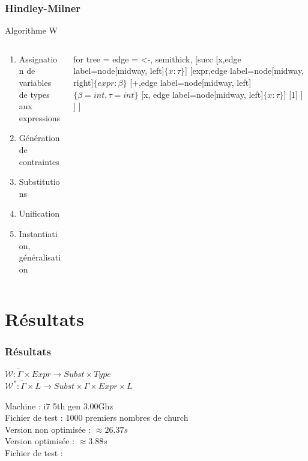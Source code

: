\documentclass{beamer}
\begin{document}
\begin{frame}
		\frametitle{Hindley-Milner}
		Algorithme W
		\begin{columns}
				\begin{column}{0.5\textwidth}
						\begin{enumerate}
								\item Assignation de variables de types aux expressions
								\item Génération de contraintes
								\item Substitutions
								\item Unification
								\item Instantiation, généralisation
						\end{enumerate}
				\end{column}
				\begin{column}{0.5\textwidth}
						\begin{forest}
								for tree = {
										edge = {<-, semithick},
								}
								[succ
								[x,edge label={node[midway, left]{$\{x:\tau\}$}}]
										[expr,edge label={node[midway, right]{$\{expr:\beta\}$}}
												[+,edge label={node[midway, left]{$\{\beta = int, \tau = int\}$}}
														[x, edge label={node[midway, left]{$\{x:\tau\}$}}]
														[1]	
												]
										]
								]
						\end{forest}
				\end{column}
		\end{columns}
\end{frame}

\section{Résultats}
\begin{frame}[t]
		\frametitle{Résultats}
		
		\begin{center}
				$\mathcal W : \tilde \Gamma \times Expr \to Subst \times Type$\\
				$\mathcal W^* : \tilde \Gamma \times L \to Subst \times \Gamma \times Expr \times L $	
		\end{center}
		
		Machine : i7 5th gen 3.00Ghz\\
		\vspace{5mm}
		Fichier de test : 1000 premiers nombres de church\\
		Version non optimisée : $\approx 26.37s$\\
		Version optimisée : $\approx 3.88s$\\
		\vspace{5mm}
		Fichier de test :
\end{frame}
\end{document}
